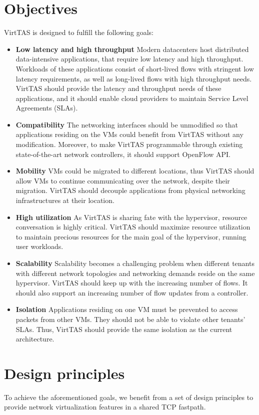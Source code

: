 
\section{Objectives}
VirtTAS is designed to fulfill the following goals:

\begin{itemize}
    \item \textbf{Low latency and high throughput} %
    Modern datacenters host distributed data-intensive applications, that require low latency and high throughput. Workloads of these applications consist of short-lived flows with stringent low latency requirements, as well as long-lived flows with high throughput needs. VirtTAS should provide the latency and throughput needs of these applications, and it should enable cloud providers to maintain Service Level Agreements (SLAs). 
    
    \item \textbf{Compatibility} %
    The networking interfaces should be unmodified so that applications residing on the VMs could benefit from VirtTAS without any modification.
    Moreover, to make VirtTAS programmable through existing state-of-the-art network controllers, it should support OpenFlow API.
    \item \textbf{Mobility} %
    VMs could be migrated to different locations, thus VirtTAS should allow VMs to continue communicating over the network, despite their migration. VirtTAS should decouple applications from physical networking infrastructures at their location.
    \item \textbf{High utilization}
    As VirtTAS is sharing fate with the hypervisor, resource conversation is highly critical. VirtTAS should maximize resource utilization to maintain precious resources for the main goal of the hypervisor, running user workloads.
    \item \textbf{Scalability} %
    Scalability becomes a challenging problem when different tenants with different network topologies and networking demands reside on the same hypervisor. VirtTAS should keep up with the increasing number of flows. It should also support an increasing number of flow updates from a controller.
    \item \textbf{Isolation} 
    Applications residing on one VM must be prevented to access packets from other VMs. They should not be able to violate other tenants' SLAs. Thus, VirtTAS should provide the same isolation as the current architecture.
\end{itemize}



\section{Design principles}
To achieve the aforementioned goals, we benefit from a set of design principles to provide network virtualization features in a shared TCP fastpath.
